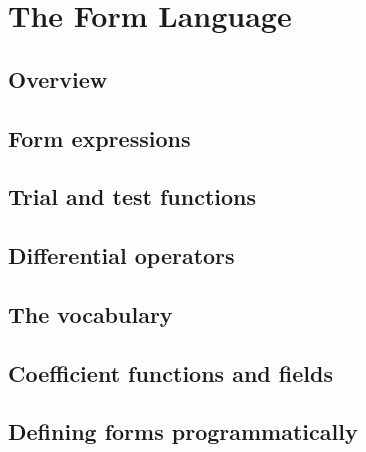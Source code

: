 \chapter{The Form Language}
\label{ch:formlang}

\section{Overview}
\label{sec:formlang:overview}


\section{Form expressions}
\label{sec:formlang:expr}


\section{Trial and test functions}
\label{sec:formlang:trialtest}


\section{Differential operators}
\label{sec:formlang:operators}


\section{The vocabulary}
\label{sec:formlang:vocabulary}


\section{Coefficient functions and fields}
\label{sec:formlang:coefficients}


\section{Defining forms programmatically}
\label{sec:formlang:defining}

